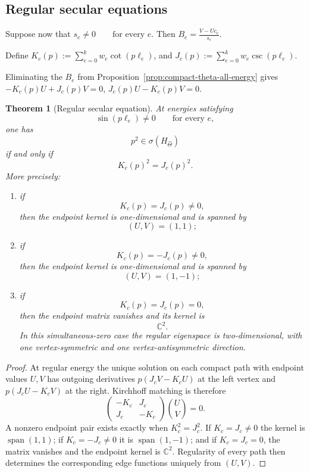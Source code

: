 \documentclass[11pt]{article}
\theoremstyle{plain}
\newtheorem{theorem}{Theorem}[section]
\theoremstyle{definition}
\begin{document}
\subsection{Regular secular equations}
\label{subsec:compact-theta-half-angle}

Suppose now that
\(s_e\neq0 \qquad \text{for every }e\).
Then
\(B_e = \frac{V-Uc_e}{s_e}\).

Define
\(K_c(p) := \sum_{e=0}^{k} w_e\cot(p\ell_e)\),
and
\(J_c(p) := \sum_{e=0}^{k} w_e\csc(p\ell_e)\).

Eliminating the \(B_e\) from
Proposition~\ref{prop:compact-theta-all-energy} gives
\(-K_c(p)U+J_c(p)V=0\),
\(J_c(p)U-K_c(p)V=0\).

\begin{theorem}[Regular secular equation]
\label{thm:compact-theta-secular}
At energies satisfying
\[
  \sin(p\ell_e)\neq0
  \qquad
  \text{for every }e,
\]
one has
\[
  p^2\in\sigma(H_{\widehat\Theta})
\]
if and only if
\[
  K_c(p)^2=J_c(p)^2.
\]
More precisely:
\begin{enumerate}[label=\textup{(\roman*)}]
  \item if
        \[
          K_c(p)=J_c(p)\neq0,
        \]
        then the endpoint kernel is one-dimensional and is spanned by
        \[
          (U,V)=(1,1);
        \]

  \item if
        \[
          K_c(p)=-J_c(p)\neq0,
        \]
        then the endpoint kernel is one-dimensional and is spanned by
        \[
          (U,V)=(1,-1);
        \]

  \item if
        \[
          K_c(p)=J_c(p)=0,
        \]
        then the endpoint matrix vanishes and its kernel is
        \[
          \mathbb C^2.
        \]
        In this simultaneous-zero case the regular eigenspace is
        two-dimensional, with one vertex-symmetric and one
        vertex-antisymmetric direction.
\end{enumerate}
\end{theorem}

\begin{proof}
At regular energy the unique solution on each compact path with endpoint values \(U,V\) has outgoing derivatives \(p(J_cV-K_cU)\) at the left vertex and \(p(J_cU-K_cV)\) at the right. Kirchhoff matching is therefore
\[
 \begin{pmatrix}-K_c&J_c\\J_c&-K_c\end{pmatrix}
 \binom UV=0.
\]
A nonzero endpoint pair exists exactly when \(K_c^2=J_c^2\). If \(K_c=J_c\ne0\) the kernel is \(\operatorname{span}(1,1)\); if \(K_c=-J_c\ne0\) it is \(\operatorname{span}(1,-1)\); and if \(K_c=J_c=0\), the matrix vanishes and the endpoint kernel is \(\mathbb C^2\). Regularity of every path then determines the corresponding edge functions uniquely from \((U,V)\).
\end{proof}
\end{document}
